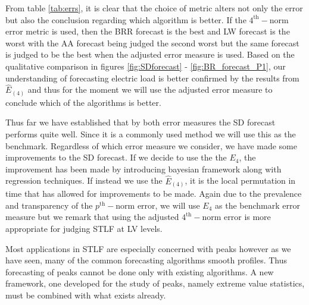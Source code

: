 From table \ref{tab:errs}, it is clear that the choice of metric alters not only the error but also the conclusion regarding which algorithm is better. If the $4^{\text{th}}-$norm error metric is used, then the BRR forecast is the best and LW forecast is the worst with the AA forecast being judged the second worst but the same forecast is judged to be the best when the adjusted error measure is used. Based on the qualitative comparison in figures \ref{fig:SDforecast} - \ref{fig:BR_forecast_P1}, our understanding of forecasting electric load is better confirmed by the results from $\hat{E}_{(4)}$ and thus for the moment we will use the adjusted error measure to conclude which of the algorithms is better.

Thus far we have established that by both error measures the SD forecast performs quite well. Since it is a commonly used method we will use this as the benchmark. Regardless of which error measure we consider, we have made some improvements to the SD forecast. If we decide to use the the $E_4$, the improvement has been made by introducing bayesian framework along with regression techniques. If instead we use the $\hat{E}_{(4)}$, it is the local permutation in time that has allowed for improvements to be made. Again due to the prevalence and transparency of the $p^{\text{th}}-$norm error, we will use $E_4$ as the benchmark error measure but we remark that using the adjusted $4^{\text{th}}-$norm error is more appropriate for judging STLF at LV levels. 

Most applications in STLF are especially concerned with peaks however as we have seen, many of the common forecasting algorithms smooth profiles. Thus forecasting of peaks cannot be done only with existing algorithms. A new framework, one developed for the study of peaks, namely extreme value statistics, must be combined with what exists already. %




